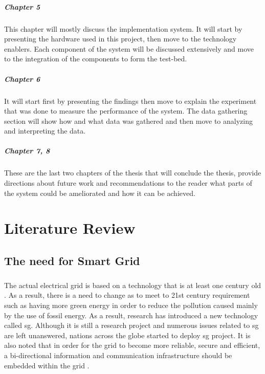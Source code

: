 \documentclass[oneside,12pt,a4paper,final]{book}
\begin{document}
\paragraph{Chapter 5}
This chapter will mostly discuss the implementation system. It will start by presenting the hardware used in this project, then move to the technology enablers. Each component of the system will be discussed extensively and move to the integration of the components to form the test-bed.
\paragraph{Chapter 6}
It will start first by presenting the findings then move to explain the experiment that was done to measure the performance of the system. The data gathering section will show how and what data was gathered and then move to analyzing and interpreting the data.
\paragraph{Chapter 7, 8}
These are the last two chapters of the thesis that will conclude the thesis, provide directions about future work and recommendations to the reader what parts of the system could be ameliorated and how it can be achieved.
\chapter{Literature Review}
\section{The need for Smart Grid}
\paragraph{}
The actual electrical grid is based on a technology that is at least one century old \cite{ref5}. As a result, there is a need to change as to meet to 21st century requirement such as having more green energy in order to reduce the pollution caused mainly by the use of fossil energy. As a result, research has introduced a new technology called \gls{sg}. Although it is still a research project and numerous issues related to \gls{sg} are left unanswered, nations across the globe started to deploy \gls{sg} project. It is also noted that in order for the grid to become more reliable, secure and efficient, a bi-directional information and communication infrastructure should be embedded within the grid \cite{ref5}.
\end{document}
